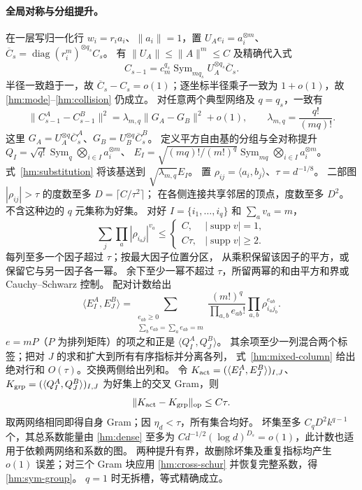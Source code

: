 \documentclass[a4paper]{tufte-handout}
\begin{document}
\begin{fullwidth}
\paragraph{全局对称与分组提升。}
在一层写归一化行 $w_i=r_i a_i$、$\|a_i\|=1$，置
$U_Ae_i=a_i^{\otimes m}$、$\overline C_s=\operatorname{diag}(r_i^m)^{\otimes q_s}C_s$。
有 $\|U_A\|\le\|A\|^m\le C$ 及精确代入式
\begin{equation}\label{hm:substitution}
 C_{s-1}=c_m^{q_s}\operatorname{Sym}_{mq_s}U_A^{\otimes q_s}\overline C_s.
\end{equation}
半径一致趋于一，故 $\overline C_s-C_s=o(1)$；逐坐标半径乘子一致为 $1+o(1)$，故 \eqref{hm:mode}--\eqref{hm:collision} 仍成立。
对任意两个典型网络及 $q=q_s$，一致有
\begin{equation}\label{hm:sym-group}
 \|C_{s-1}^A-C_{s-1}^B\|^2
 =\lambda_{m,q}\|G_A-G_B\|^2+o(1),\qquad
 \lambda_{m,q}=\frac{q!}{(mq)!}.
\end{equation}
这里 $G_A=U_A^{\otimes q}\overline C_s^A$、$G_B=U_B^{\otimes q}\overline C_s^B$。
定义平方自由基的分组与全对称提升
$Q_I=\sqrt{q!}\operatorname{Sym}_q\bigotimes_{i\in I}a_i^{\otimes m}$、
$E_I=\sqrt{(mq)!/(m!)^q}\operatorname{Sym}_{mq}\bigotimes_{i\in I}a_i^{\otimes m}$。
式~\eqref{hm:substitution} 将该基送到 $\sqrt{\lambda_{m,q}}E_I$。
置 $\rho_{ij}=\langle a_i,b_j\rangle$、$\tau=d^{-1/8}$。
二部图 $|\rho_{ij}|>\tau$ 的度数至多 $D=\lceil C/\tau^2\rceil$；
在各侧连接共享邻居的顶点，度数至多 $D^2$。不含这种边的 $q$ 元集称为好集。
对好 $I=\{i_1,\ldots,i_q\}$ 和 $\sum_av_a=m$，
\begin{equation}\label{hm:mixed-column}
 \sum_j\prod_a|\rho_{i_aj}|^{v_a}\le
 \begin{cases}C,&|\operatorname{supp}v|=1,\\ C\tau,&|\operatorname{supp}v|\ge2.\end{cases}
\end{equation}
每列至多一个因子超过 $\tau$；按最大因子位置分区，
从乘积保留该因子的平方，或保留它与另一因子各一幂。
余下至少一幂不超过 $\tau$，所留两幂的和由平方和界或 Cauchy--Schwarz 控制。
配对计数给出
\[
 \langle E_I^A,E_J^B\rangle
 =\sum_{\substack{e_{ab}\ge0\\\sum_be_{ab}=\sum_ae_{ab}=m}}
 \frac{(m!)^q}{\prod_{a,b}e_{ab}!}\prod_{a,b}\rho_{i_aj_b}^{e_{ab}}.
\]
$e=mP$（$P$ 为排列矩阵）的项之和正是 $\langle Q_I^A,Q_J^B\rangle$。
其余项至少一列混合两个标签；把对 $J$ 的求和扩大到所有有序指标并分离各列，
式~\eqref{hm:mixed-column} 给出绝对行和 $O(\tau)$。交换两侧给出列和。
令 $K_{\rm act}=(\langle E_I^A,E_J^B\rangle)_{I,J}$、
$K_{\rm grp}=(\langle Q_I^A,Q_J^B\rangle)_{I,J}$ 为好集上的交叉 Gram，则
\begin{equation}\label{hm:cross-schur}
 \|K_{\rm act}-K_{\rm grp}\|_{\rm op}\le C\tau.
\end{equation}
取两网络相同即得自身 Gram；因 $\eta_d<\tau$，所有集合均好。
坏集至多 $C_qD^2k^{q-1}$ 个，其总系数能量由 \eqref{hm:dense} 至多为
$Cd^{-1/2}(\log d)^{D_s}=o(1)$，此计数也适用于依赖两网络和系数的图。
两种提升有界，故删除坏集及重复指标均产生 $o(1)$ 误差；对三个 Gram 块应用
\eqref{hm:cross-schur} 并恢复完整系数，得 \eqref{hm:sym-group}。
$q=1$ 时无拆槽，等式精确成立。


\end{fullwidth}
\end{document}
